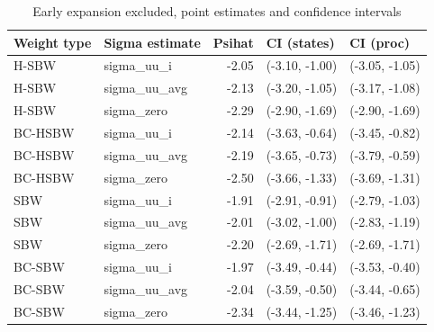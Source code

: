 \begin{table}[ht]
\centering
\caption{Early expansion excluded, point estimates and confidence intervals}
\label{tab:confintmainc2}
\begin{tabular}{llrll}
  \toprule
Weight type & Sigma estimate & Psihat & CI (states) & CI (proc) \\ 
  \midrule
H-SBW & sigma\_uu\_i & -2.05 & (-3.10, -1.00) & (-3.05, -1.05) \\ 
  H-SBW & sigma\_uu\_avg & -2.13 & (-3.20, -1.05) & (-3.17, -1.08) \\ 
  H-SBW & sigma\_zero & -2.29 & (-2.90, -1.69) & (-2.90, -1.69) \\ 
  BC-HSBW & sigma\_uu\_i & -2.14 & (-3.63, -0.64) & (-3.45, -0.82) \\ 
  BC-HSBW & sigma\_uu\_avg & -2.19 & (-3.65, -0.73) & (-3.79, -0.59) \\ 
  BC-HSBW & sigma\_zero & -2.50 & (-3.66, -1.33) & (-3.69, -1.31) \\ 
  SBW & sigma\_uu\_i & -1.91 & (-2.91, -0.91) & (-2.79, -1.03) \\ 
  SBW & sigma\_uu\_avg & -2.01 & (-3.02, -1.00) & (-2.83, -1.19) \\ 
  SBW & sigma\_zero & -2.20 & (-2.69, -1.71) & (-2.69, -1.71) \\ 
  BC-SBW & sigma\_uu\_i & -1.97 & (-3.49, -0.44) & (-3.53, -0.40) \\ 
  BC-SBW & sigma\_uu\_avg & -2.04 & (-3.59, -0.50) & (-3.44, -0.65) \\ 
  BC-SBW & sigma\_zero & -2.34 & (-3.44, -1.25) & (-3.46, -1.23) \\ 
   \bottomrule
\end{tabular}
\end{table}

